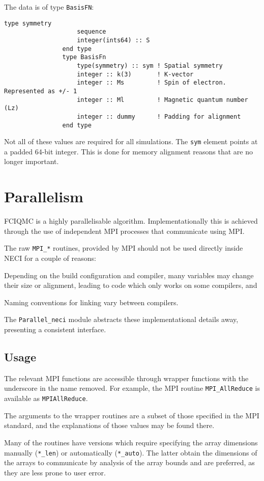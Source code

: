 \documentclass[a4paper,notitlepage,dvipsnames]{scrreprt}
\newenvironment{packed_itemize}{
	\begin{itemize}
		\setlength{\itemsep}{1pt}
		\setlength{\parskip}{0pt}
		\setlength{\parsep}{0pt}
	}{\end{itemize}}
\let\code\lstinline
\begin{document}
{{{\begin{description}
			The data is of type \code{BasisFN}:
			\begin{lstlisting}[gobble=12]
				type symmetry
					sequence
					integer(ints64) :: S
				end type
				type BasisFn
					type(symmetry) :: sym ! Spatial symmetry
					integer :: k(3)       ! K-vector
					integer :: Ms         ! Spin of electron. Represented as +/- 1
					integer :: Ml         ! Magnetic quantum number (Lz)
					integer :: dummy      ! Padding for alignment
				end type
			\end{lstlisting}
			Not all of these values are required for all simulations. The
			\code{sym} element points at a padded 64-bit integer. This
			is done for memory alignment reasons that are no longer important.
	\end{description}

\section{Parallelism}
	FCIQMC is a highly parallelisable algorithm. Implementationally this is
	achieved through the use of independent MPI processes that communicate
	using MPI.

	The raw \code{MPI_*} routines, provided by MPI should not be used directly
	inside NECI for a couple of reasons:
	\begin{packed_itemize}
		\item
			Depending on the build configuration and compiler, many variables
			may change their size or alignment, leading to code which only
			works on some compilers, and
		\item
			Naming conventions for linking vary between compilers.
	\end{packed_itemize}
	The \code{Parallel_neci} module abstracts these implementational details
	away, presenting a consistent interface.

\subsection{Usage}
	The relevant MPI functions are accessible through wrapper functions with the
	underscore in the name removed. For example, the MPI routine
	\code{MPI_AllReduce} is available as \code{MPIAllReduce}.

	The arguments to the wrapper routines are a subset of those specified in the
	MPI standard, and the explanations of those values may be found there.

	Many of the routines have versions which require specifying the array
	dimensions manually (\code{*_len}) or automatically (\code{*_auto}). The
	latter obtain the dimensions of the arrays to communicate by analysis of
	the array bounds and are preferred, as they are less prone to user error.

}}}
\end{document}
